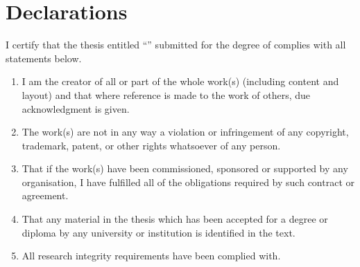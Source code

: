 \newpage
\chapter*{Declarations}

I certify that the thesis entitled ``\textit{\thetitle{}}'' submitted for the degree of \thedegree{} complies with all statements below.

\begin{enumerate}[label=(\roman*)]
  \item I am the creator of all or part of the whole work(s) (including content and layout) and that where reference is made to the work of others, due acknowledgment is given.    
  \item The work(s) are not in any way a violation or infringement of any copyright, trademark, patent, or other rights whatsoever of any person.
  \item That if the work(s) have been commissioned, sponsored or supported by any organisation, I have fulfilled all of the obligations required by such contract or agreement.
  \item That any material in the thesis which has been accepted for a degree or diploma by any university or institution is identified in the text.
  \item All research integrity requirements have been complied with.
\end{enumerate}

\vspace{2cm}

\noindent
\hspace{\fill}
\parbox[b]{0.4\linewidth}{
  \hrulefill\\
  \raggedleft
  \theauthor{}\\
  \footnotesize
  \theauthorspostnominals{}\\
  \thedate{}
}